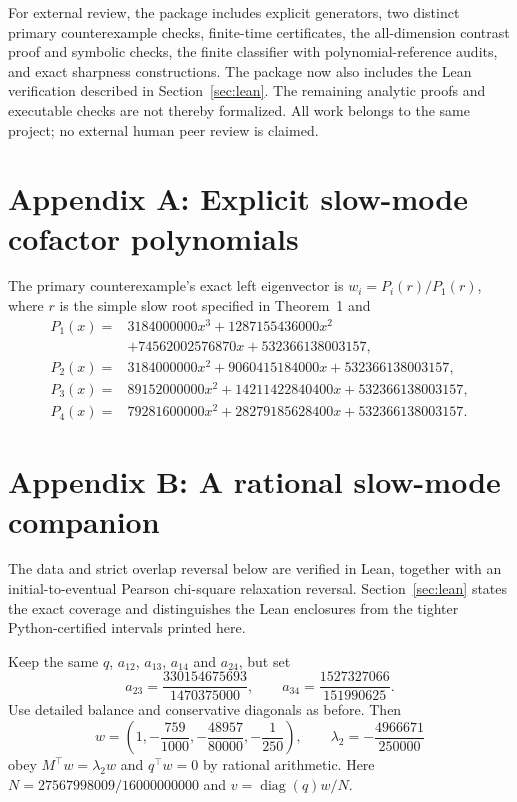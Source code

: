 \documentclass[11pt]{article}
\newcommand{\diag}{\operatorname{diag}}
\begin{document}
For external review, the package includes explicit generators, two distinct primary counterexample checks, finite-time certificates, the all-dimension contrast proof and symbolic checks, the finite classifier with polynomial-reference audits, and exact sharpness constructions. The package now also includes the Lean verification described in Section~\ref{sec:lean}. The remaining analytic proofs and executable checks are not thereby formalized. All work belongs to the same project; no external human peer review is claimed.

\section*{Appendix A: Explicit slow-mode cofactor polynomials}\label{app:cofactors}
The primary counterexample's exact left eigenvector is $w_i=P_i(r)/P_1(r)$, where $r$ is the simple slow root specified in Theorem~1 and
\begin{align*}
P_1(x)={}&3184000000x^3+1287155436000x^2\\
&+74562002576870x+532366138003157,\\
P_2(x)={}&3184000000x^2+9060415184000x+532366138003157,\\
P_3(x)={}&89152000000x^2+14211422840400x+532366138003157,\\
P_4(x)={}&79281600000x^2+28279185628400x+532366138003157.
\end{align*}

\section*{Appendix B: A rational slow-mode companion}\label{app:rational}
The data and strict overlap reversal below are verified in Lean, together with an initial-to-eventual Pearson chi-square relaxation reversal. Section~\ref{sec:lean} states the exact coverage and distinguishes the Lean enclosures from the tighter Python-certified intervals printed here.

Keep the same $q$, $a_{12}$, $a_{13}$, $a_{14}$ and $a_{24}$, but set
\[
a_{23}=\frac{330154675693}{1470375000},\qquad
 a_{34}=\frac{1527327066}{151990625}.
\]
Use detailed balance and conservative diagonals as before. Then
\[
w=\left(1,-\frac{759}{1000},-\frac{48957}{80000},-\frac1{250}\right),
\qquad \lambda_2=-\frac{4966671}{250000}
\]
obey $M^\top w=\lambda_2w$ and $q^\top w=0$ by rational arithmetic. Here $N=27567998009/16000000000$ and $v=\diag(q)w/N$.
\end{document}
